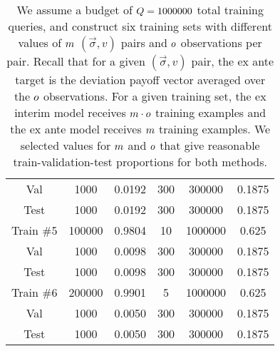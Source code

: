 \begin{table*}[ht]
\begin{tabular}{c|c|c|c|c|c}
Val       & 1000                               & 0.0192                          & 300                             & 300000                              & 0.1875                         \\
Test      & 1000                               & 0.0192                          & 300                             & 300000                              & 0.1875                         \\ \hline
Train \#5 & 100000                             & 0.9804                          & 10                              & 1000000                             & 0.625                          \\
Val       & 1000                               & 0.0098                          & 300                             & 300000                              & 0.1875                         \\
Test      & 1000                               & 0.0098                          & 300                             & 300000                              & 0.1875                         \\ \hline
Train \#6 & 200000                             & 0.9901                          & 5                               & 1000000                             & 0.625                          \\
Val       & 1000                               & 0.0050                          & 300                             & 300000                              & 0.1875                         \\
Test      & 1000                               & 0.0050                          & 300                             & 300000                              & 0.1875                         
\end{tabular}
\caption{We assume a budget of $Q = 1000000$ total training queries, and construct six training sets with different values of $m$ $(\vec{\sigma}, v)$ pairs and $o$ observations per pair. 
Recall that for a given $(\vec{\sigma}, v)$ pair, the ex ante target is the deviation payoff vector averaged over the $o$ observations.
For a given training set, the ex interim model receives $m\cdot o$ training examples and the ex ante model receives $m$ training examples.
We selected values for $m$ and $o$ that give reasonable train-validation-test proportions for both methods.}
\label{table:game1_train_val_test_split}
\end{table*}